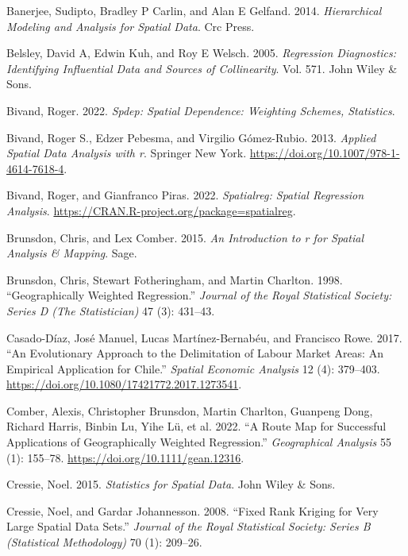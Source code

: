 \documentclass[
  letterpaper,
  DIV=11,
  numbers=noendperiod,
  oneside]{scrreprt}
\newlength{\cslhangindent}
\newenvironment{CSLReferences}[2] %
 {\begin{list}{}{%
  \setlength{\itemindent}{0pt}
  \setlength{\leftmargin}{0pt}
  \setlength{\parsep}{0pt}
  \ifodd #1
   \setlength{\leftmargin}{\cslhangindent}
   \setlength{\itemindent}{-1\cslhangindent}
  \fi
  \setlength{\itemsep}{#2\baselineskip}}}
 {\end{list}}
\begin{document}
\begin{CSLReferences}{1}{0}
Banerjee, Sudipto, Bradley P Carlin, and Alan E Gelfand. 2014.
\emph{Hierarchical Modeling and Analysis for Spatial Data}. Crc Press.

Belsley, David A, Edwin Kuh, and Roy E Welsch. 2005. \emph{Regression
Diagnostics: Identifying Influential Data and Sources of Collinearity}.
Vol. 571. John Wiley \& Sons.

Bivand, Roger. 2022. \emph{Spdep: Spatial Dependence: Weighting Schemes,
Statistics}.

Bivand, Roger S., Edzer Pebesma, and Virgilio Gómez-Rubio. 2013.
\emph{Applied Spatial Data Analysis with r}. Springer New York.
\url{https://doi.org/10.1007/978-1-4614-7618-4}.

Bivand, Roger, and Gianfranco Piras. 2022. \emph{Spatialreg: Spatial
Regression Analysis}.
\url{https://CRAN.R-project.org/package=spatialreg}.

Brunsdon, Chris, and Lex Comber. 2015. \emph{An Introduction to r for
Spatial Analysis \& Mapping}. Sage.

Brunsdon, Chris, Stewart Fotheringham, and Martin Charlton. 1998.
{``Geographically Weighted Regression.''} \emph{Journal of the Royal
Statistical Society: Series D (The Statistician)} 47 (3): 431--43.

Casado-Díaz, José Manuel, Lucas Martínez-Bernabéu, and Francisco Rowe.
2017. {``An Evolutionary Approach to the Delimitation of Labour Market
Areas: An Empirical Application for Chile.''} \emph{Spatial Economic
Analysis} 12 (4): 379--403.
\url{https://doi.org/10.1080/17421772.2017.1273541}.

Comber, Alexis, Christopher Brunsdon, Martin Charlton, Guanpeng Dong,
Richard Harris, Binbin Lu, Yihe Lü, et al. 2022. {``A Route Map for
Successful Applications of Geographically Weighted Regression.''}
\emph{Geographical Analysis} 55 (1): 155--78.
\url{https://doi.org/10.1111/gean.12316}.

Cressie, Noel. 2015. \emph{Statistics for Spatial Data}. John Wiley \&
Sons.

Cressie, Noel, and Gardar Johannesson. 2008. {``Fixed Rank Kriging for
Very Large Spatial Data Sets.''} \emph{Journal of the Royal Statistical
Society: Series B (Statistical Methodology)} 70 (1): 209--26.


\end{CSLReferences}
\end{document}
